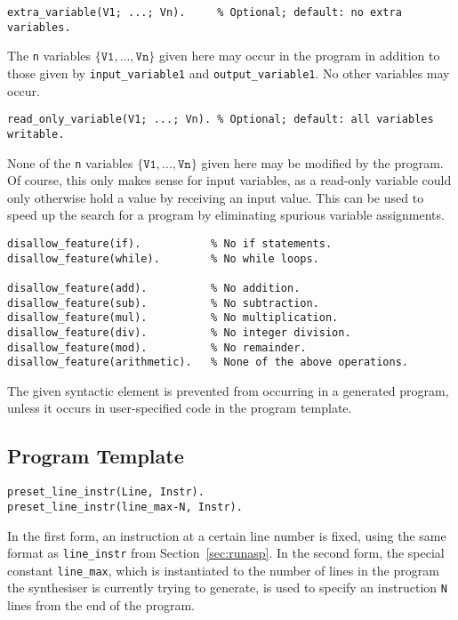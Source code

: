 \documentclass[a4paper,twoside,notitlepage]{report}
\newcommand{\ttt}{\texttt}
\begin{document}
\begin{Verbatim}[samepage=true]
extra_variable(V1; ...; Vn).     % Optional; default: no extra variables.
\end{Verbatim}
The \texttt{n} variables $\{\ttt{V1}, ..., \ttt{Vn}\}$ given here 
may occur in the program in addition to those given by \ttt{input\_variable\/1}
and \ttt{output\_variable\/1}. No other variables may occur.

\begin{Verbatim}[samepage=true]
read_only_variable(V1; ...; Vn). % Optional; default: all variables writable.
\end{Verbatim}
None of the \texttt{n} variables $\{\ttt{V1}, ..., \ttt{Vn}\}$ 
given here may be modified by the program. Of course, this only makes sense 
for input variables, as a read-only variable could only otherwise hold a value 
by receiving an input value. This can be used to speed up the search for a 
program by eliminating spurious variable assignments.

\begin{Verbatim}[samepage=true]
disallow_feature(if).           % No if statements.
disallow_feature(while).        % No while loops.

disallow_feature(add).          % No addition.
disallow_feature(sub).          % No subtraction.
disallow_feature(mul).          % No multiplication.
disallow_feature(div).          % No integer division.
disallow_feature(mod).          % No remainder.
disallow_feature(arithmetic).   % None of the above operations.
\end{Verbatim}
The given syntactic element is prevented from occurring in a generated 
program, unless it occurs in user-specified code in the program template.

\subsection{Program Template}
\begin{Verbatim}[samepage=true]
preset_line_instr(Line, Instr).
preset_line_instr(line_max-N, Instr).
\end{Verbatim}
In the first form, an instruction at a certain line number is fixed, using 
the same format as \verb|line_instr| from Section~\ref{sec:runasp}. In the 
second form, the special constant \verb|line_max|, which is instantiated 
to the number of lines in the program the synthesiser is currently trying 
to generate, is used to specify an instruction \verb|N| lines from the 
end of the program.
\end{document}
